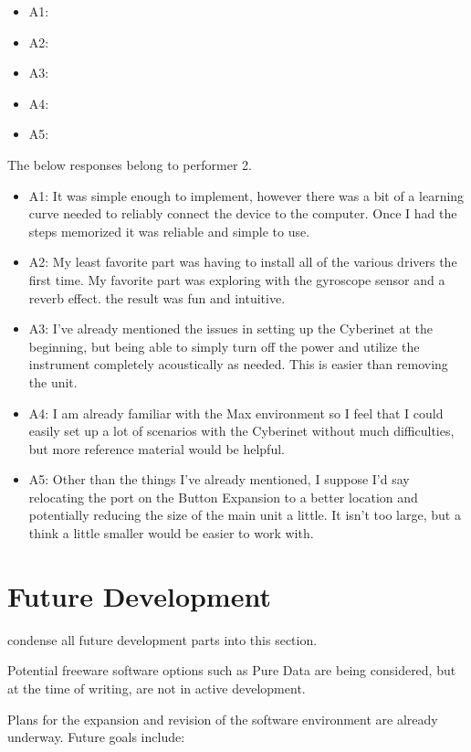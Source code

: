 \begin{itemize}
    \item A1:
    \item A2:
    \item A3:
    \item A4:
    \item A5:
\end{itemize}

The below responses belong to performer 2. %

\begin{itemize}
    \item A1: It was simple enough to implement, however there was a bit of a learning curve needed to reliably connect the device to the computer. Once I had the steps memorized it was reliable and simple to use.
    \item A2: My least favorite part was having to install all of the various drivers the first time. My favorite part was exploring with the gyroscope sensor and a reverb effect. the result was fun and intuitive.
    \item A3: I've already mentioned the issues in setting up the Cyberinet at the beginning, but being able to simply turn off the power and utilize the instrument completely acoustically as needed. This is easier than removing the unit.
    \item A4: I am already familiar with the Max environment so I feel that I could easily set up a lot of scenarios with the Cyberinet without much difficulties, but more reference material would be helpful. 
    \item A5: Other than the things I've already mentioned, I suppose I'd say relocating the port on the Button Expansion to a better location and potentially reducing the size of the main unit a little. It isn't too large, but a think a little smaller would be easier to work with.
\end{itemize}

\section{Future Development}
condense all future development parts into this section.


Potential freeware software options such as Pure Data are being considered, but at the time of writing, are not in active development.

Plans for the expansion and revision of the software environment are already underway. Future goals include:

